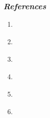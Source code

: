 \subsubsection*{\it References}
\begin{enumerate}
\item {} \label{refGB86}
\vspace{-\parsep}
\item {} \label{refH87}
\vspace{-\parsep}
\item {} \label{refK64}
\vspace{-\parsep}
\item {} \label{refK84}
\vspace{-\parsep}
\item {} \label{refLQ89} 
\vspace{-\parsep}
\item {} \label{refRS75}
\end{enumerate}

\newpage

$\quad$

